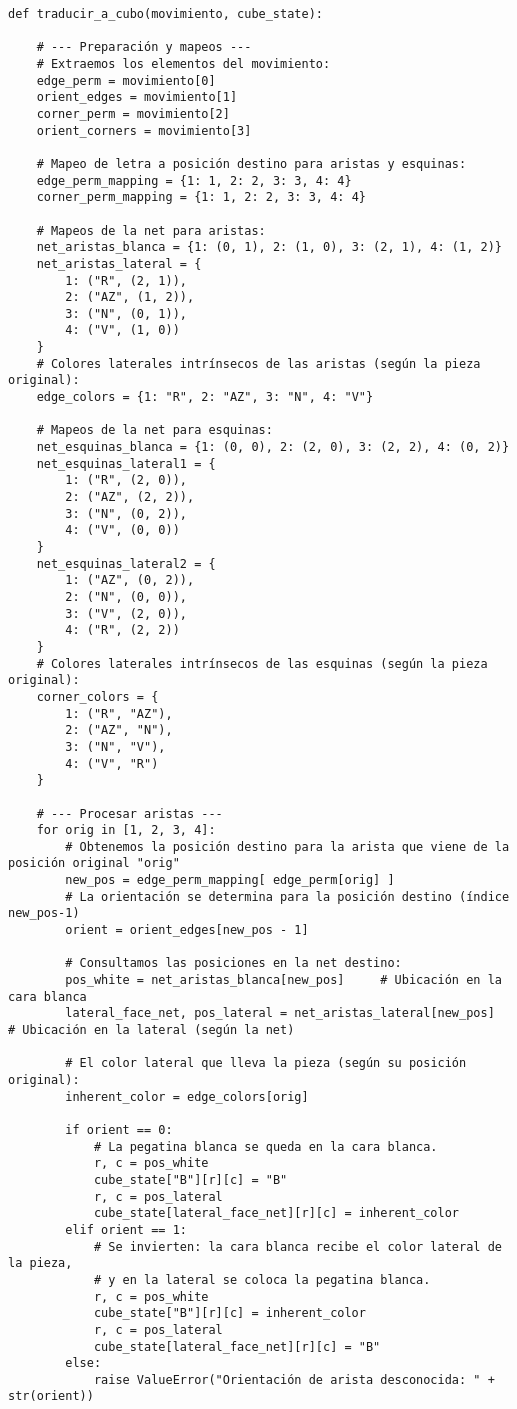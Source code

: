 \begin{lstlisting}
def traducir_a_cubo(movimiento, cube_state):

    # --- Preparación y mapeos ---
    # Extraemos los elementos del movimiento:
    edge_perm = movimiento[0]       
    orient_edges = movimiento[1]    
    corner_perm = movimiento[2]     
    orient_corners = movimiento[3]
    
    # Mapeo de letra a posición destino para aristas y esquinas:
    edge_perm_mapping = {1: 1, 2: 2, 3: 3, 4: 4}
    corner_perm_mapping = {1: 1, 2: 2, 3: 3, 4: 4}
    
    # Mapeos de la net para aristas:
    net_aristas_blanca = {1: (0, 1), 2: (1, 0), 3: (2, 1), 4: (1, 2)}
    net_aristas_lateral = {
        1: ("R", (2, 1)),
        2: ("AZ", (1, 2)),
        3: ("N", (0, 1)),
        4: ("V", (1, 0))
    }
    # Colores laterales intrínsecos de las aristas (según la pieza original):
    edge_colors = {1: "R", 2: "AZ", 3: "N", 4: "V"}
    
    # Mapeos de la net para esquinas:
    net_esquinas_blanca = {1: (0, 0), 2: (2, 0), 3: (2, 2), 4: (0, 2)}
    net_esquinas_lateral1 = {
        1: ("R", (2, 0)),
        2: ("AZ", (2, 2)),
        3: ("N", (0, 2)),
        4: ("V", (0, 0))
    }
    net_esquinas_lateral2 = {
        1: ("AZ", (0, 2)),
        2: ("N", (0, 0)),
        3: ("V", (2, 0)),
        4: ("R", (2, 2))
    }
    # Colores laterales intrínsecos de las esquinas (según la pieza original):
    corner_colors = {
        1: ("R", "AZ"),
        2: ("AZ", "N"),
        3: ("N", "V"),
        4: ("V", "R")
    }
    
    # --- Procesar aristas ---
    for orig in [1, 2, 3, 4]:
        # Obtenemos la posición destino para la arista que viene de la posición original "orig"
        new_pos = edge_perm_mapping[ edge_perm[orig] ]
        # La orientación se determina para la posición destino (índice new_pos-1)
        orient = orient_edges[new_pos - 1]
        
        # Consultamos las posiciones en la net destino:
        pos_white = net_aristas_blanca[new_pos]     # Ubicación en la cara blanca
        lateral_face_net, pos_lateral = net_aristas_lateral[new_pos]  # Ubicación en la lateral (según la net)
        
        # El color lateral que lleva la pieza (según su posición original):
        inherent_color = edge_colors[orig]
        
        if orient == 0:
            # La pegatina blanca se queda en la cara blanca.
            r, c = pos_white
            cube_state["B"][r][c] = "B"
            r, c = pos_lateral
            cube_state[lateral_face_net][r][c] = inherent_color
        elif orient == 1:
            # Se invierten: la cara blanca recibe el color lateral de la pieza,
            # y en la lateral se coloca la pegatina blanca.
            r, c = pos_white
            cube_state["B"][r][c] = inherent_color
            r, c = pos_lateral
            cube_state[lateral_face_net][r][c] = "B"
        else:
            raise ValueError("Orientación de arista desconocida: " + str(orient))
    

\end{lstlisting}
